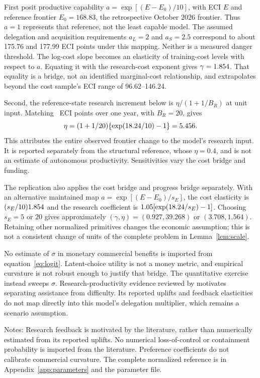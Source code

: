First posit productive capability $a=\exp[(E-E_0)/10]$, with ECI $E$ and reference frontier $E_0=168.83$, the retrospective October 2026 frontier. Thus $a=1$ represents that reference, not the least capable model. The assumed delegation and acquisition requirements $a_L=2$ and $a_S=2.5$ correspond to about 175.76 and 177.99 ECI points under this mapping. Neither is a measured danger threshold. The log-cost slope becomes an elasticity of training-cost levels with respect to $a$. Equating it with the research-cost exponent gives $\gamma=1.854$. That equality is a bridge, not an identified marginal-cost relationship, and extrapolates beyond the cost sample's ECI range of 96.62--146.24.

Second, the reference-state research increment below is $\eta/(1+1/B_R)$ at unit input. Matching \FrontierDrift\ ECI points over one year, with $B_R=20$, gives
\begin{equation}
 \eta=(1+1/20)\{\exp(18.24/10)-1\}=5.456.
\end{equation}
This attributes the entire observed frontier change to the model's research input. It is reported separately from the structural reference, whose $\eta=0.4$, and is not an estimate of autonomous productivity. Sensitivities vary the cost bridge and funding.

The replication also applies the cost bridge and progress bridge separately. With an alternative maintained map $a=\exp[(E-E_0)/s_E]$, the cost elasticity is $(s_E/10)1.854$ and the research coefficient is $1.05[\exp(18.24/s_E)-1]$. Choosing $s_E=5$ or $20$ gives approximately $(\gamma,\eta)=(0.927,39.268)$ or $(3.708,1.564)$. Retaining other normalized primitives changes the economic assumption; this is not a consistent change of units of the complete problem in Lemma~\ref{lem:scale}.

No estimate of $\sigma$ in monetary commercial benefits is imported from equation~\eqref{eq:logit}. Latent-choice utility is not a money metric, and empirical curvature is not robust enough to justify that bridge. The quantitative exercise instead sweeps $\sigma$. Research-productivity evidence reviewed by \citet{cunningham2026} motivates separating assistance from difficulty. Its reported uplifts and feedback elasticities do not map directly into this model's delegation multiplier, which remains a scenario assumption.

\begin{table}[htbp]\centering\small
\caption{Estimated quantities, calibration bridges, and assumptions}\label{tab:identification}

\begin{minipage}{\textwidth}\footnotesize\vspace{0.4em}
Notes: Research feedback is motivated by the literature, rather than numerically estimated from its reported uplifts. No numerical loss-of-control or containment probability is imported from the literature. Preference coefficients do not calibrate commercial curvature. The complete normalized reference is in Appendix~\ref{app:parameters} and the parameter file.
\end{minipage}
\end{table}

